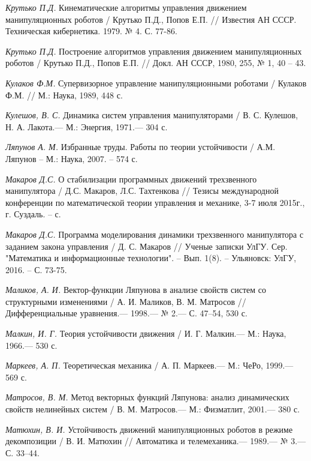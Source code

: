 \begin{thebibliography}{10}
	{\it Крутько П.Д.} Кинематические алгоритмы управления движением манипуляционных роботов / Крутько П.Д., Попов Е.П. // Известия АН СССР. Техническая кибернетика. 1979. № 4. С. 77-86.

	{\it Крутько П.Д.} Построение алгоритмов управления движением манипуляционных роботов / Крутько П.Д., Попов Е.П. // Докл. АН СССР, 1980, 255, 		№ 1, 40 – 43.
	
	{\it Кулаков Ф.М.} Супервизорное управление манипуляционными роботами / Кулаков Ф.М. // М.: Наука, 1989, 448 с.
	
	{\it Кулешов, В. С.} Динамика систем управления манипуляторами / В. С. Кулешов,
	Н. А. Лакота.— М.: Энергия, 1971.— 304 с.
	
	{\it Ляпунов А. М.} Избранные труды. Работы по теории устойчивости / А.М. Ляпунов – М.: Наука, 2007. – 574 с.

	{\it Макаров Д.С.} О стабилизации программных движений трехзвенного манипулятора / Д.С. Макаров, Л.С. Тахтенкова // Тезисы международной 		конференции по математической теории управления и механике, 3-7 июля 2015г., г. Суздаль. – с. 
	
	{\it Макаров Д.С.} Программа моделирования динамики трехзвенного манипулятора с заданием закона управления / Д. С. Макаров // Ученые записки УлГУ. Сер. "Математика и информационные технологии". -- Вып. 1(8). -- Ульяновск: УлГУ, 2016. -- С. 73-75.
	
	{\it Маликов, А. И.} Вектор-функции Ляпунова в анализе свойств систем со структурными изменениями / А. И. Маликов, В. М. Матросов // 			Дифференциальные уравнения.— 1998.— № 2.— С. 47–54, 530 с.
	
	{\it Малкин, И. Г.} Теория устойчивости движения / И. Г. Малкин.— М.: Наука, 1966.—
	530 с.
	
	{\it Маркеев, А. П.} Теоретическая механика / А. П. Маркеев.— М.: ЧеРо, 1999.— 569 с.
	
	{\it Матросов, В. М.} Метод векторных функций Ляпунова: анализ динамических свойств нелинейных систем / В. М. Матросов.— М.: Физматлит, 2001.— 		380 с.

	{\it Матюхин, В. И.} Устойчивость движений манипуляционных роботов в режиме декомпозиции
	/ В. И. Матюхин // Автоматика и телемеханика.— 1989.— № 3.— С. 33–44.
	

\end{thebibliography}
